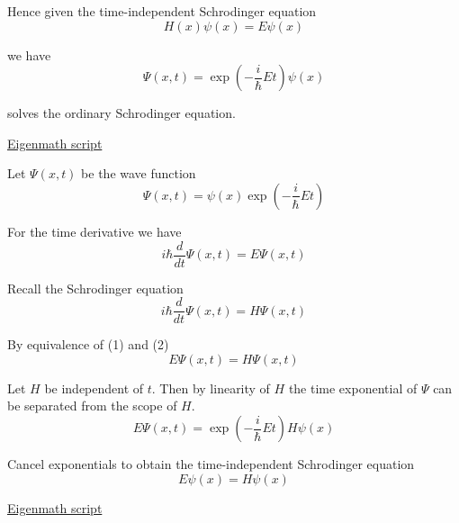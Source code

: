 Hence given the time-independent Schrodinger equation
\begin{equation*}
H(x)\psi(x)=E\psi(x)
\end{equation*}

we have
\begin{equation*}
\Psi(x,t)=\exp\left(-\frac{i}{\hbar}Et\right)\psi(x)
\end{equation*}

solves the ordinary Schrodinger equation.

\bigskip
\href{https://georgeweigt.github.io/examples/time-independent-schrodinger-equation-demo.html}{Eigenmath script}




Let $\Psi(x,t)$ be the wave function
\begin{equation*}
\Psi(x,t)=\psi(x)\exp\left(-\frac{i}{\hbar}Et\right)
\end{equation*}

For the time derivative we have
\begin{equation*}
i\hbar\frac{d}{dt}\Psi(x,t)=E\Psi(x,t)
\tag{1}
\end{equation*}

Recall the Schrodinger equation
\begin{equation*}
i\hbar\frac{d}{dt}\Psi(x,t)=H\Psi(x,t)
\tag{2}
\end{equation*}

By equivalence of (1) and (2)
\begin{equation*}
E\Psi(x,t)=H\Psi(x,t)
\end{equation*}

Let $H$ be independent of $t$.
Then by linearity of $H$ the time exponential of $\Psi$ can be separated from the scope of $H$.
\begin{equation*}
E\Psi(x,t)=\exp\left(-\frac{i}{\hbar}Et\right)H\psi(x)
\end{equation*}

Cancel exponentials to obtain the time-independent Schrodinger equation
\begin{equation*}
E\psi(x)=H\psi(x)
\end{equation*}

\href{https://georgeweigt.github.io/examples/time-independent-schrodinger-equation-demo.html}{Eigenmath script}


